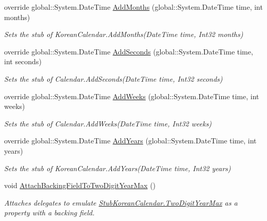 \begin{DoxyCompactItemize}
override global\-::\-System.\-Date\-Time \hyperlink{class_system_1_1_globalization_1_1_fakes_1_1_stub_korean_calendar_ab2fd88389410e624f64b5663d57986b6}{Add\-Months} (global\-::\-System.\-Date\-Time time, int months)
\begin{DoxyCompactList}\small\item\em Sets the stub of Korean\-Calendar.\-Add\-Months(\-Date\-Time time, Int32 months)\end{DoxyCompactList}\item 
override global\-::\-System.\-Date\-Time \hyperlink{class_system_1_1_globalization_1_1_fakes_1_1_stub_korean_calendar_a29400a4772587137713732c265dc32ab}{Add\-Seconds} (global\-::\-System.\-Date\-Time time, int seconds)
\begin{DoxyCompactList}\small\item\em Sets the stub of Calendar.\-Add\-Seconds(\-Date\-Time time, Int32 seconds)\end{DoxyCompactList}\item 
override global\-::\-System.\-Date\-Time \hyperlink{class_system_1_1_globalization_1_1_fakes_1_1_stub_korean_calendar_a78ccd726cabaf75df1f7f5fbce3676f2}{Add\-Weeks} (global\-::\-System.\-Date\-Time time, int weeks)
\begin{DoxyCompactList}\small\item\em Sets the stub of Calendar.\-Add\-Weeks(\-Date\-Time time, Int32 weeks)\end{DoxyCompactList}\item 
override global\-::\-System.\-Date\-Time \hyperlink{class_system_1_1_globalization_1_1_fakes_1_1_stub_korean_calendar_ae325a28c31d4c2e9425f664e6d6866f4}{Add\-Years} (global\-::\-System.\-Date\-Time time, int years)
\begin{DoxyCompactList}\small\item\em Sets the stub of Korean\-Calendar.\-Add\-Years(\-Date\-Time time, Int32 years)\end{DoxyCompactList}\item 
void \hyperlink{class_system_1_1_globalization_1_1_fakes_1_1_stub_korean_calendar_aa3c04382c8dd30298e82f72fd9579829}{Attach\-Backing\-Field\-To\-Two\-Digit\-Year\-Max} ()
\begin{DoxyCompactList}\small\item\em Attaches delegates to emulate \hyperlink{class_system_1_1_globalization_1_1_fakes_1_1_stub_korean_calendar_a2f2decc15ee8fe3475ba6a75cf1a4ac5}{Stub\-Korean\-Calendar.\-Two\-Digit\-Year\-Max} as a property with a backing field.\end{DoxyCompactList}\item 

\end{DoxyCompactItemize}
